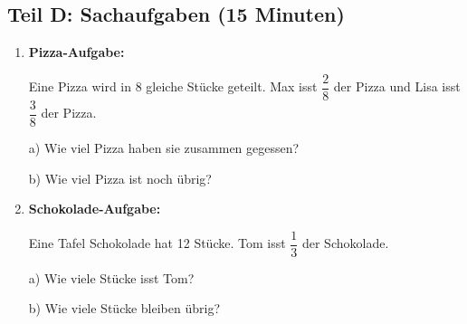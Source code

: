 \subsection*{Teil D: Sachaufgaben (15 Minuten)}

\begin{enumerate}[label=\arabic*.]
    \item \textbf{Pizza-Aufgabe:}

    Eine Pizza wird in 8 gleiche Stücke geteilt. Max isst $\dfrac{2}{8}$ der Pizza und Lisa isst $\dfrac{3}{8}$ der Pizza.

    a) Wie viel Pizza haben sie zusammen gegessen? \underline{\hspace{3cm}}

    b) Wie viel Pizza ist noch übrig? \underline{\hspace{3cm}}

    \vspace{0.5cm}

    \item \textbf{Schokolade-Aufgabe:}

    Eine Tafel Schokolade hat 12 Stücke. Tom isst $\dfrac{1}{3}$ der Schokolade.

    a) Wie viele Stücke isst Tom? \underline{\hspace{3cm}}

    b) Wie viele Stücke bleiben übrig? \underline{\hspace{3cm}}

\end{enumerate}